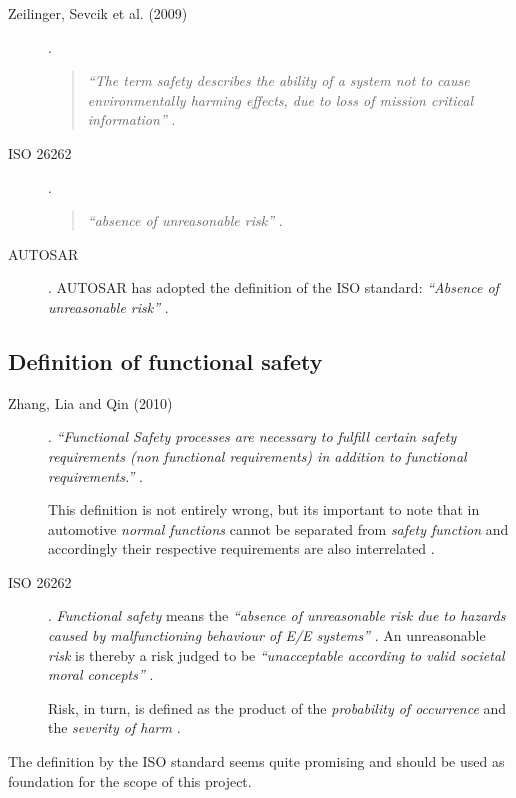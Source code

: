 \begin{description}
\item [Zeilinger, Sevcik et al. (2009)].
\begin{quote}
\emph{``The term safety describes the ability of a system not to cause environmentally harming effects, due to loss of mission critical information''} 
\cite[p.1]{zeilinger2009}.
\end{quote}

\item [ISO 26262]. 
\begin{quote}
\emph{``absence of unreasonable risk''} \cite{iso26262:1}.
\end{quote}

\item [AUTOSAR].
AUTOSAR has adopted the definition of the ISO standard:
\emph{``Absence of unreasonable risk''} \cite{autosar_glossary}.
\end{description}

\subsection{Definition of functional safety}

\begin{description}
\item [Zhang, Lia and Qin (2010)].
\emph{``Functional Safety processes are necessary to fulfill certain safety requirements (non functional requirements) in addition to functional requirements.''} \cite{zhang}.

This definition is not entirely wrong, but its important to note that in automotive \emph{normal functions} cannot be separated from \emph{safety function} and accordingly their respective requirements are also interrelated \cite{iso26262:course1}.

\item [ISO 26262].
\emph{Functional safety} means the \emph{``absence of unreasonable risk due to hazards caused by malfunctioning behaviour of E/E systems''} \cite{iso26262:1}. An unreasonable \emph{risk} is thereby a risk judged to be \emph{``unacceptable according to valid societal moral concepts''} \cite{iso26262:1}.

Risk, in turn, is defined as the product of the \emph{probability of occurrence} and the \emph{severity of harm} \cite{iso26262:1}.
\end{description}

The definition by the ISO standard seems quite promising and should be used as foundation for the scope of this project.

